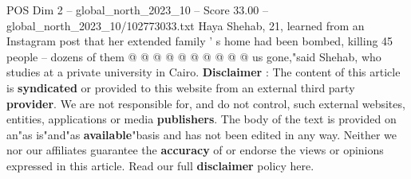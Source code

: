 \begin{textsample}{POS Dim 2 – global\_north\_2023\_10 – Score 33.00 – global\_north\_2023\_10/102773033.txt}
Haya Shehab, 21, learned from an Instagram post that her extended family ' s home had been bombed, killing 45 people -- dozens of them @ @ @ @ @ @ @ @ @ @ us gone,"said Shehab, who studies at a private university in Cairo. \textbf{Disclaimer} : The content of this article is \textbf{syndicated} or provided to this website from an external third party \textbf{provider}.
We are not responsible for, and do not control, such external websites, entities, applications or media \textbf{publishers}.
The body of the text is provided on an"as is"and"as \textbf{available}"basis and has not been edited in any way.
Neither we nor our affiliates guarantee the \textbf{accuracy} of or endorse the views or opinions expressed in this article.
Read our full \textbf{disclaimer} policy here.

\end{textsample}

